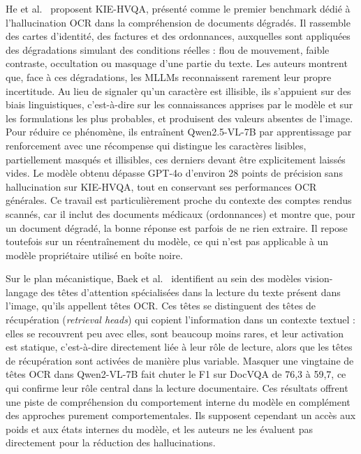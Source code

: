 He et al.~\cite{he2025seeing} proposent KIE-HVQA, présenté comme le premier benchmark dédié à l'hallucination OCR dans la compréhension de documents dégradés. Il rassemble des cartes d'identité, des factures et des ordonnances, auxquelles sont appliquées des dégradations simulant des conditions réelles : flou de mouvement, faible contraste, occultation ou masquage d'une partie du texte. Les auteurs montrent que, face à ces dégradations, les MLLMs reconnaissent rarement leur propre incertitude. Au lieu de signaler qu'un caractère est illisible, ils s'appuient sur des biais linguistiques, c'est-à-dire sur les connaissances apprises par le modèle et sur les formulations les plus probables, et produisent des valeurs absentes de l'image. Pour réduire ce phénomène, ils entraînent Qwen2.5-VL-7B par apprentissage par renforcement avec une récompense qui distingue les caractères lisibles, partiellement masqués et illisibles, ces derniers devant être explicitement laissés vides. Le modèle obtenu dépasse GPT-4o d'environ 28 points de précision sans hallucination sur KIE-HVQA, tout en conservant ses performances OCR générales. Ce travail est particulièrement proche du contexte des comptes rendus scannés, car il inclut des documents médicaux (ordonnances) et montre que, pour un document dégradé, la bonne réponse est parfois de ne rien extraire. Il repose toutefois sur un réentraînement du modèle, ce qui n'est pas applicable à un modèle propriétaire utilisé en boîte noire.

Sur le plan mécanistique, Baek et al.~\cite{baek2025ocrheads} identifient au sein des modèles vision-langage des têtes d'attention spécialisées dans la lecture du texte présent dans l'image, qu'ils appellent têtes OCR. Ces têtes se distinguent des têtes de récupération (\textit{retrieval heads}) qui copient l'information dans un contexte textuel : elles se recouvrent peu avec elles, sont beaucoup moins rares, et leur activation est statique, c'est-à-dire directement liée à leur rôle de lecture, alors que les têtes de récupération sont activées de manière plus variable. Masquer une vingtaine de têtes OCR dans Qwen2-VL-7B fait chuter le F1 sur DocVQA de 76,3 à 59,7, ce qui confirme leur rôle central dans la lecture documentaire. Ces résultats offrent une piste de compréhension du comportement interne du modèle en complément des approches purement comportementales. Ils supposent cependant un accès aux poids et aux états internes du modèle, et les auteurs ne les évaluent pas directement pour la réduction des hallucinations.

